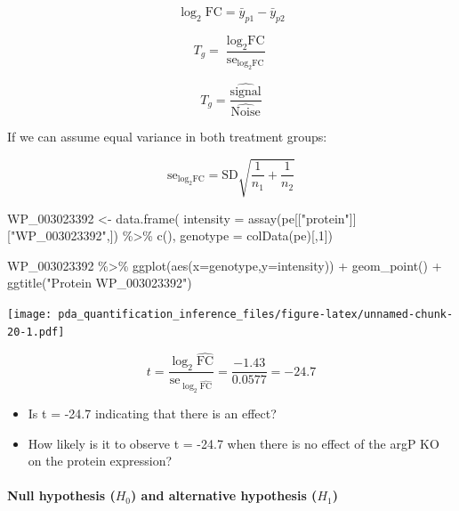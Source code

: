\documentclass[
]{article}
\newenvironment{Shaded}{\begin{snugshade}}{\end{snugshade}}
\newcommand{\AttributeTok}[1]{\textcolor[rgb]{0.77,0.63,0.00}{#1}}
\newcommand{\DecValTok}[1]{\textcolor[rgb]{0.00,0.00,0.81}{#1}}
\newcommand{\FunctionTok}[1]{\textcolor[rgb]{0.00,0.00,0.00}{#1}}
\newcommand{\NormalTok}[1]{#1}
\newcommand{\OtherTok}[1]{\textcolor[rgb]{0.56,0.35,0.01}{#1}}
\newcommand{\SpecialCharTok}[1]{\textcolor[rgb]{0.00,0.00,0.00}{#1}}
\newcommand{\StringTok}[1]{\textcolor[rgb]{0.31,0.60,0.02}{#1}}
\begin{document}
\[
 \log_2 \text{FC} = \bar{y}_{p1}-\bar{y}_{p2}
\]

\[
T_g=\frac{\log_2 \text{FC}}{\text{se}_{\log_2 \text{FC}}}
\]

\[
T_g=\frac{\widehat{\text{signal}}}{\widehat{\text{Noise}}}
\]

If we can assume equal variance in both treatment groups:

\[
\text{se}_{\log_2 \text{FC}}=\text{SD}\sqrt{\frac{1}{n_1}+\frac{1}{n_2}}
\]

\begin{Shaded}
\begin{Highlighting}[]
\NormalTok{WP\_003023392 }\OtherTok{\textless{}{-}} \FunctionTok{data.frame}\NormalTok{(}
    \AttributeTok{intensity =} \FunctionTok{assay}\NormalTok{(pe[[}\StringTok{"protein"}\NormalTok{]][}\StringTok{"WP\_003023392"}\NormalTok{,]) }\SpecialCharTok{\%\textgreater{}\%} \FunctionTok{c}\NormalTok{(), }
    \AttributeTok{genotype =} \FunctionTok{colData}\NormalTok{(pe)[,}\DecValTok{1}\NormalTok{]) }

\NormalTok{WP\_003023392 }\SpecialCharTok{\%\textgreater{}\%} 
  \FunctionTok{ggplot}\NormalTok{(}\FunctionTok{aes}\NormalTok{(}\AttributeTok{x=}\NormalTok{genotype,}\AttributeTok{y=}\NormalTok{intensity)) }\SpecialCharTok{+} 
  \FunctionTok{geom\_point}\NormalTok{() }\SpecialCharTok{+}
  \FunctionTok{ggtitle}\NormalTok{(}\StringTok{"Protein WP\_003023392"}\NormalTok{)}
\end{Highlighting}
\end{Shaded}

\texttt{[image: pda\_quantification\_inference\_files/figure-latex/unnamed-chunk-20-1.pdf]}

\[
t=\frac{\log_2\widehat{\text{FC}}}{\text{se}_{\log_2\widehat{\text{FC}}}}=\frac{-1.43}{0.0577}=-24.7
\]

\begin{itemize}
\item
  Is t = -24.7 indicating that there is an effect?
\item
  How likely is it to observe t = -24.7 when there is no effect of the
  argP KO on the protein expression?
\end{itemize}

\hypertarget{null-hypothesis-h_0-and-alternative-hypothesis-h_1}{%
\paragraph{\texorpdfstring{Null hypothesis (\(H_0\)) and alternative
hypothesis
(\(H_1\))}{Null hypothesis (H\_0) and alternative hypothesis (H\_1)}}\label{null-hypothesis-h_0-and-alternative-hypothesis-h_1}}
\end{document}
